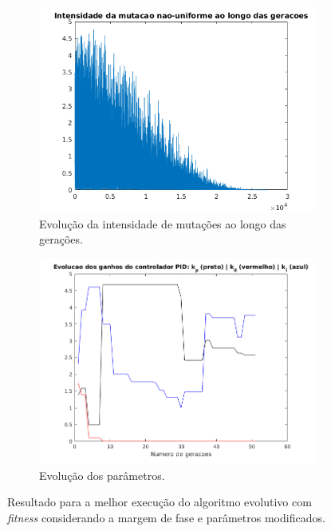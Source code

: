 \begin {enumerate}
\begin{figure}[h!]
		\begin{subfigure}{.5\textwidth}
		  \centering
		  \includegraphics[width=1\linewidth]{pid/mutacao_pid_ex_d_mod}
		  \caption{\centering Evolução da intensidade de mutações ao longo das
		  gerações.}
		  \label{fig:pid_mutacao_d_5}
		\end{subfigure}%
		\begin{subfigure}{.5\textwidth}
		  \centering
		  \includegraphics[width=1\linewidth]{pid/kp_kd_ki_pid_ex_d_mod}
		  \caption{\centering Evolução dos parâmetros.}
		  \label{fig:pid_parametros_d_mod} 
		\end{subfigure}
	
	\caption{Resultado para a melhor execução do algoritmo evolutivo com
	\textit{fitness} considerando a margem de fase e parâmetros modificados.}
	\end{figure}
	

\end{enumerate}
